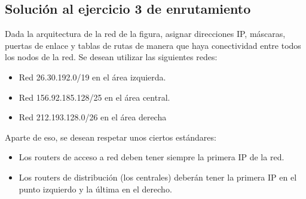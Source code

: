 \documentclass[letterpaper,10pt,spanish]{sphinxmanual}
\begin{document}
\subsection{Solución al ejercicio 3 de enrutamiento}
\label{\detokenize{t2_integracion_elementos/ejercicios_subredes_ipv4/ejercicios_dos_router:solucion-al-ejercicio-3-de-enrutamiento}}
\sphinxAtStartPar
Dada la arquitectura de la red de la figura, asignar direcciones IP, máscaras, puertas de enlace y tablas de rutas de manera que haya conectividad entre todos
los nodos de la red. Se desean utilizar las siguientes redes:
\begin{itemize}
\item {} 
\sphinxAtStartPar
Red 26.30.192.0/19 en el área izquierda.

\item {} 
\sphinxAtStartPar
Red 156.92.185.128/25 en el área central.

\item {} 
\sphinxAtStartPar
Red 212.193.128.0/26 en el área derecha

\end{itemize}

\begin{figure}[htbp]
\centering

\noindent{}
\end{figure}

\sphinxAtStartPar
Aparte de eso, se desean respetar unos ciertos estándares:
\begin{itemize}
\item {} 
\sphinxAtStartPar
Los routers de acceso a red deben tener siempre la primera IP de la red.

\item {} 
\sphinxAtStartPar
Los routers de distribución (los centrales) deberán tener la primera IP en el punto izquierdo y la última en el derecho.

\end{itemize}
\end{document}
